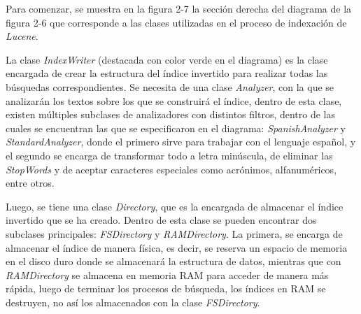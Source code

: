 \documentclass{memoria}
\begin{document}

Para comenzar, se muestra en la figura 2-7 la sección derecha del diagrama de la figura 2-6 que corresponde a las clases utilizadas en el proceso de indexación de \textsl{Lucene}. 

La clase \textsl{IndexWriter} (destacada con color verde en el diagrama) es la clase encargada de crear la estructura del índice invertido para realizar todas las búsquedas correspondientes. Se necesita de una clase \textsl{Analyzer}, con la que se analizarán los textos sobre los que se construirá el índice, dentro de esta clase, existen múltiples subclases de analizadores con distintos filtros, dentro de las cuales se encuentran las que se especificaron en el diagrama: \textsl{SpanishAnalyzer} y \textsl{StandardAnalyzer}, donde el primero sirve para trabajar con el lenguaje español, y el segundo se encarga de transformar todo a letra minúscula, de eliminar las \textsl{StopWords} y de aceptar caracteres especiales como acrónimos, alfanuméricos, entre otros.

Luego, se tiene una clase \textsl{Directory}, que es la encargada de almacenar el índice invertido que se ha creado. Dentro de esta clase se pueden encontrar dos subclases principales: \textsl{FSDirectory} y \textsl{RAMDirectory}. La primera, se encarga de almacenar el índice de manera física, es decir, se reserva un espacio de memoria en el disco duro donde se almacenará la estructura de datos, mientras que con \textsl{RAMDirectory} se almacena en memoria RAM para acceder de manera más rápida, luego de terminar los procesos de búsqueda, los índices en RAM se destruyen, no así los almacenados con la clase \textsl{FSDirectory}. 
\end{document}

